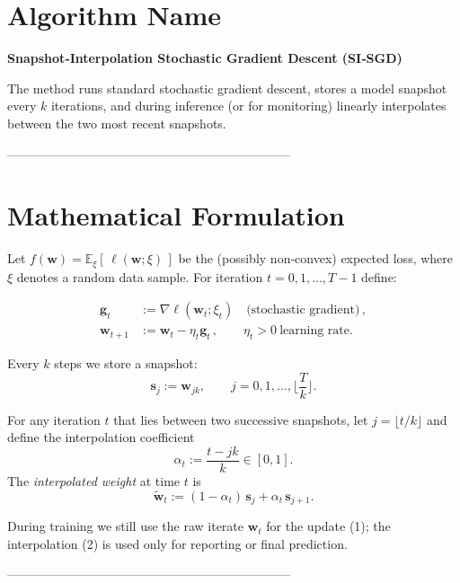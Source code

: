 \documentclass{article}
\begin{document}
\section*{Algorithm Name}
\textbf{Snapshot‑Interpolation Stochastic Gradient Descent (SI‑SGD)}  

The method runs standard stochastic gradient descent, stores a model snapshot every $k$ iterations, and during inference (or for monitoring) linearly interpolates between the two most recent snapshots.

--------------------------------------------------------------------

\section*{Mathematical Formulation}
Let $f(\mathbf{w})=\mathbb{E}_{\xi}[\,\ell(\mathbf{w};\xi)\,]$ be the (possibly non‑convex) expected loss, where $\xi$ denotes a random data sample.  
For iteration $t=0,1,\dots,T-1$ define:

\begin{align}
\mathbf{g}_t &:= \nabla \ell(\mathbf{w}_t; \xi_t) \quad\text{(stochastic gradient)}\,,\\[4pt]
\mathbf{w}_{t+1} &:= \mathbf{w}_t - \eta_t \mathbf{g}_t\,, \qquad \eta_t>0\ \text{learning rate}. \tag{1}
\end{align}

Every $k$ steps we store a snapshot:
\[
\mathbf{s}_j := \mathbf{w}_{jk},\qquad j=0,1,\dots,\Big\lfloor \frac{T}{k}\Big\rfloor .
\]

For any iteration $t$ that lies between two successive snapshots,
let $j=\lfloor t/k\rfloor$ and define the interpolation coefficient
\[
\alpha_t:=\frac{t-jk}{k}\in[0,1].
\]
The \emph{interpolated weight} at time $t$ is
\[
\tilde{\mathbf{w}}_t := (1-\alpha_t)\,\mathbf{s}_j + \alpha_t\,\mathbf{s}_{j+1}. \tag{2}
\]

During training we still use the raw iterate $\mathbf{w}_t$ for the update (1); the interpolation (2) is used only for reporting or final prediction.

--------------------------------------------------------------------
\end{document}
